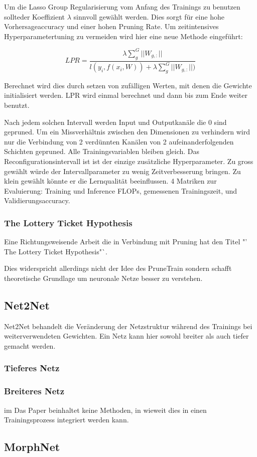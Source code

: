 Um die Lasso Group Regularisierung vom Anfang des Trainings zu benutzen sollteder Koeffizient $\lambda$ sinnvoll gewählt werden. Dies sorgt für eine hohe Vorhersageaccuracy und einer hohen Pruning Rate. Um zeitintensives Hyperparametertuning zu vermeiden wird hier eine neue Methode eingeführt:
 
 $$LPR=\frac{\lambda \sum_{g}^{G}|| W_{g,:} ||}{l(y_i,f(x_i,W))+\lambda \sum_{g}^{G}||W_{g,:} ||)} $$
 
 Berechnet wird dies durch setzen von zufälligen Werten, mit denen die Gewichte initialisiert werden. LPR wird einmal berechnet und dann bis zum Ende weiter benutzt.

 
 Nach jedem solchen Intervall werden Input und Outputkanäle die 0 sind gepruned. Um ein Missverhältnis zwischen den Dimensionen zu verhindern wird nur die Verbindung von 2 verdünnten Kanälen von 2 aufeinanderfolgenden Schichten gepruned. Alle Trainingsvariablen bleiben gleich.
 Das Reconfigurationsintervall ist ist der einzige zusätzliche Hyperparameter. Zu gross gewählt würde der Intervallparameter zu wenig Zeitverbesserung bringen. Zu klein gewählt könnte er die Lernqualität beeinflussen.
4 Matriken zur Evaluierung: Training und Inference FLOPs, gemessenen Trainingszeit, und Validierungsaccuracy. 

\subsubsection{The Lottery Ticket Hypothesis}

Eine Richtungsweisende Arbeit die in Verbindung mit Pruning hat den Titel "' The Lottery Ticket Hypothesis"`. 



Dies widerspricht allerdings nicht der Idee des PruneTrain sondern schafft theoretische Grundlage um neuronale Netze besser zu verstehen.




\subsection{Net2Net}

Net2Net behandelt die Veränderung der Netzstruktur während des Trainings bei weiterverwendeten Gewichten. 
Ein Netz kann hier sowohl breiter als auch tiefer gemacht werden.

\subsubsection{Tieferes Netz}



\subsubsection{Breiteres Netz}


im
Das Paper beinhaltet keine Methoden, in wieweit dies in einen Trainingsprozess integriert werden kann.


\subsection{MorphNet}


